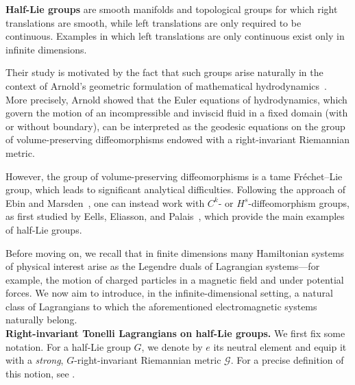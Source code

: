 \documentclass[11pt,reqno]{amsart}
\theoremstyle{plain}
\theoremstyle{definition}
\theoremstyle{plain} %
\theoremstyle{definition} %
\numberwithin{equation}{section}
\begin{document}
\textbf{Half-Lie groups} are smooth manifolds and topological groups for which right translations are smooth, while left translations are only required to be continuous. Examples in which left translations are only continuous exist only in infinite dimensions. 

Their study is motivated by the fact that such groups arise naturally in the context of Arnold’s geometric formulation of mathematical hydrodynamics~\cite{Arnold66}. More precisely, Arnold showed that the Euler equations of hydrodynamics, which govern the motion of an incompressible and inviscid fluid in a fixed domain (with or without boundary), can be interpreted as the geodesic equations on the group of volume-preserving diffeomorphisms endowed with a right-invariant Riemannian metric. 

However, the group of volume-preserving diffeomorphisms is a tame Fréchet–Lie group, which leads to significant analytical difficulties. Following the approach of Ebin and Marsden~\cite{EM70}, one can instead work with $C^k$- or $H^s$-diffeomorphism groups, as first studied by Eells, Eliasson, and Palais~\cite{Eells66, Eliasson67, Palais68}, which provide the main examples of half-Lie groups.

Before moving on, we recall that in finite dimensions many Hamiltonian systems of physical interest arise as the Legendre duals of Lagrangian systems—for example, the motion of charged particles in a magnetic field and under potential forces. We now aim to introduce, in the infinite-dimensional setting, a natural class of Lagrangians to which the aforementioned electromagnetic systems naturally belong.\\

\textbf{Right-invariant Tonelli Lagrangians on half-Lie groups.} 
We first fix some notation. For a half-Lie group \( G \), we denote by \( e \) its neutral element and equip it with a \emph{strong}, \( G \)-right-invariant Riemannian metric \( \mathcal{G} \). For a precise definition of this notion, see . 
\end{document}
